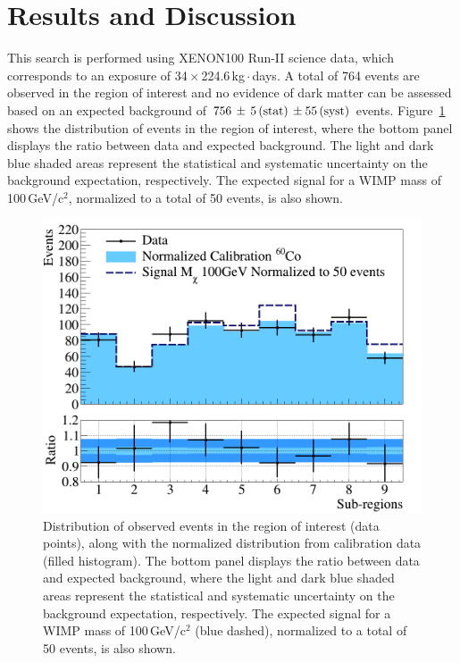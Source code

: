 \section{Results and Discussion}
\label{sec:results}

This search is performed using XENON100 Run-II science data, which corresponds to an exposure of 34\,$\times$\,224.6\,kg\,$\cdot$\,days. 
A total of 764 events are observed in the region of interest and no evidence of dark matter can be assessed based on an expected background of
$756 \, \pm \, 5 \,{\rm (stat)} \, \pm 55\, {\rm (syst)}$ events. 
Figure~\ref{fig:dataVSbkg} shows the distribution of  events  in the region of interest, where the bottom panel displays the ratio
between data and expected background. The light and dark blue shaded areas represent the statistical and systematic uncertainty 
on the background expectation, respectively. The expected signal for a WIMP mass of 100\,GeV/c$^2$, normalized to a total of 50 events, is also shown.


\begin{figure}[t!]
  \includegraphics[width=\linewidth]{images/data_vs_bkg.png}
  \caption{Distribution of  observed events  in the region of interest (data points), along with the normalized distribution from calibration data (filled histogram). The bottom panel displays the ratio
between data and expected background, where the light  and dark blue shaded areas represent the statistical and systematic uncertainty 
on the background expectation, respectively. The expected signal for a WIMP mass of 100\,GeV/c$^2$ (blue dashed), normalized to a total of 50 events, is also shown.}
  \label{fig:dataVSbkg}
\end{figure}

